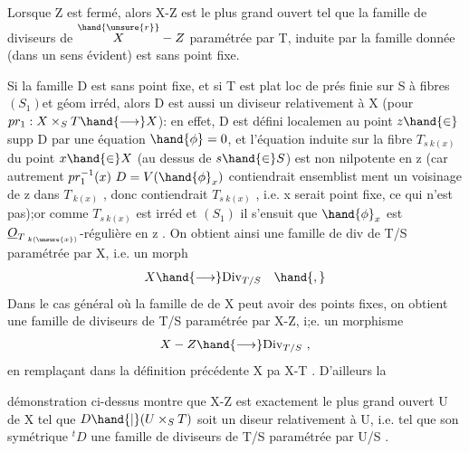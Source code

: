 
 Lorsque Z est fermé, alors X-Z est le plus grand ouvert
tel que la famille de diviseurs de $\overset{\hand{\unsure{r}}}{X}-Z$ paramétrée par T, induite par la
famille donnée (dans un sens évident) est sans point fixe.

Si la famille D est sans point fixe, et si T est plat loc de prés finie
sur S à fibres $(S_1)$et géom irréd, alors D est aussi un diviseur 
relativement à X (pour $pr_1 : X\times_S T \hand{\longrightarrow} X$): en effet, D est défini localemen
au point $z \hand{\in}$ supp D par une équation  $\hand{\phi} = 0$, et l'équation induite sur la fibre
$T_{s\ k(x)}$ du point $x\hand{\in} X$ (au dessus de $s\hand{\in} S$) est non 
nilpotente en z (car autrement $pr_1^{-1}(x)\ D = V(\hand{\phi}_x)$  contiendrait ensemblist
ment un voisinage de z dans $T_{\ k(x)}$ , donc contiendrait $T_{s\ k(x)}$ , i.e.
x serait point fixe, ce qui n'est pas);or comme $T_{s\ k(x)}$ est irréd et $(S_1)$
il s'ensuit que $\hand{\phi}_x$ est $\underline{O}_{T_{\ k(\unsure{x})}}$-régulière en z . On obtient ainsi
 une famille de div de T/S paramétrée par X, i.e. un morph
\[ X \hand{\longrightarrow} \mathrm{Div}_{T/S} \quad \hand{,} \]
Dans le cas général où la famille de  de X peut avoir des points
fixes, on obtient une famille de diviseurs de T/S paramétrée par X-Z,
i;e. un morphisme
\[ X - Z \hand{\longrightarrow} \mathrm{Div}_{T/S} \ , \]
en remplaçant dans la définition précédente X pa X-T . D'ailleurs la






 démonstration ci-dessus montre que X-Z est exactement
le plus grand ouvert U de X tel que $D\hand{|}(U\times_S T)$ soit un diseur 
relativement à U, i.e. tel que son symétrique ${}^{t}D$  une famille de diviseurs de T/S paramétrée
par U/S .

